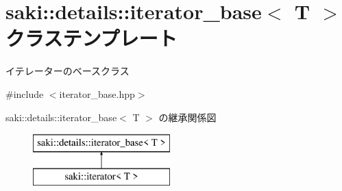 \hypertarget{classsaki_1_1details_1_1iterator__base}{}\section{saki\+:\+:details\+:\+:iterator\+\_\+base$<$ T $>$ クラステンプレート}
\label{classsaki_1_1details_1_1iterator__base}


イテレーターのベースクラス  




{\ttfamily \#include $<$iterator\+\_\+base.\+hpp$>$}

saki\+:\+:details\+:\+:iterator\+\_\+base$<$ T $>$ の継承関係図\begin{figure}[H]
\begin{center}
\leavevmode
\includegraphics[height=2.000000cm]{classsaki_1_1details_1_1iterator__base}
\end{center}
\end{figure}
